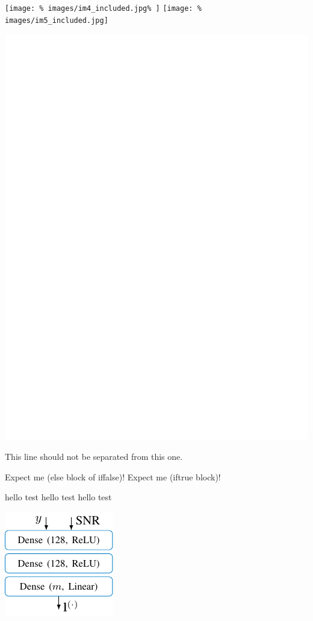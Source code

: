 \texttt{[image: \%
  images/im4\_included.jpg\%
  ]}
\texttt{[image: \%
  images/im5\_included.jpg]}

\includegraphics{./images/im3_included.jpg}

This line should not be separated
%
from this one.



\newif\ifvar
\newif  \ifvarII

\ifvarII asdf \fi

\ifvar
\fi

Expect me (else block of iffalse)!
Expect me (iftrue block)!

\newcommand{\red}[1]{{\color{red} #1}}
hello test hello
test hello
test




\includegraphics{ext_tikz/test1.pdf}






